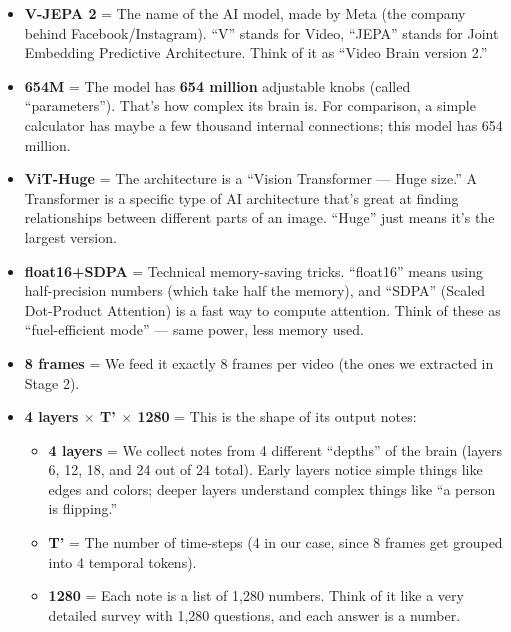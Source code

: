 \documentclass[12pt, a4paper]{article}
\begin{document}
\begin{keybox}
\begin{itemize}[leftmargin=0.5cm, itemsep=0.5cm]
    \item \textbf{V-JEPA 2} = The name of the AI model, made by Meta (the company behind Facebook/Instagram). ``V'' stands for Video, ``JEPA'' stands for Joint Embedding Predictive Architecture. Think of it as ``Video Brain version 2.''
    
    \item \textbf{654M} = The model has \textbf{654 million} adjustable knobs (called ``parameters''). That's how complex its brain is. For comparison, a simple calculator has maybe a few thousand internal connections; this model has 654 million.
    
    \item \textbf{ViT-Huge} = The architecture is a ``Vision Transformer — Huge size.'' A Transformer is a specific type of AI architecture that's great at finding relationships between different parts of an image. ``Huge'' just means it's the largest version.
    
    \item \textbf{float16+SDPA} = Technical memory-saving tricks. ``float16'' means using half-precision numbers (which take half the memory), and ``SDPA'' (Scaled Dot-Product Attention) is a fast way to compute attention. Think of these as ``fuel-efficient mode'' — same power, less memory used.
    
    \item \textbf{8 frames} = We feed it exactly 8 frames per video (the ones we extracted in Stage 2).
    
    \item \textbf{4 layers $\times$ T' $\times$ 1280} = This is the shape of its output notes:
    \begin{itemize}
        \item \textbf{4 layers} = We collect notes from 4 different ``depths'' of the brain (layers 6, 12, 18, and 24 out of 24 total). Early layers notice simple things like edges and colors; deeper layers understand complex things like ``a person is flipping.''
        \item \textbf{T'} = The number of time-steps (4 in our case, since 8 frames get grouped into 4 temporal tokens).
        \item \textbf{1280} = Each note is a list of 1,280 numbers. Think of it like a very detailed survey with 1,280 questions, and each answer is a number.
    \end{itemize}
\end{itemize}
\end{keybox}
\end{document}
